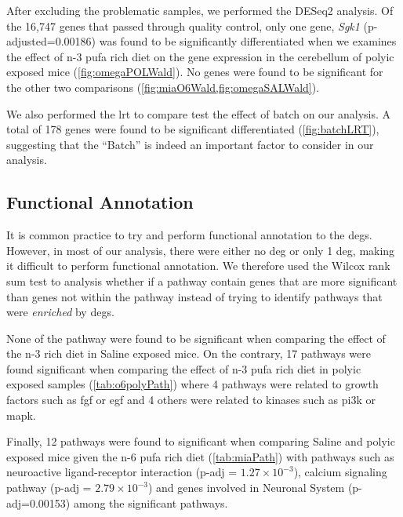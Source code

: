 \documentclass[12pt]{scrbook}
\begin{document}
After excluding the problematic samples, we performed the DESeq2 analysis.
Of the 16,747 genes that passed through quality control, only one gene, \textit{Sgk1} (p-adjusted=0.00186) was found to be significantly differentiated when we examines the effect of n-3 \gls{pufa} rich diet on the gene expression in the cerebellum of \gls{polyic} exposed mice (\cref{fig:omegaPOLWald}).
No genes were found to be significant for the other two comparisons (\cref{fig:miaO6Wald,fig:omegaSALWald}).

We also performed the \gls{lrt} to compare test the effect of batch on our analysis. 
A total of 178 genes were found to be significant differentiated (\cref{fig:batchLRT}), suggesting that the ``Batch'' is indeed an important factor to consider in our analysis.

\subsection{Functional Annotation}
It is common practice to try and perform functional annotation to the \glspl{deg}. 
However, in most of our analysis, there were either no \gls{deg} or only 1 \gls{deg}, making it difficult to perform functional annotation.
We therefore used the Wilcox rank sum test to analysis whether if a pathway contain genes that are more significant than genes not within the pathway instead of trying to identify pathways that were \emph{enriched} by \glspl{deg}.

None of the pathway were found to be significant when comparing the effect of the n-3 rich diet in Saline exposed mice. 
On the contrary, 17 pathways were found significant when comparing the effect of n-3 \gls{pufa} rich diet in \gls{polyic} exposed samples (\cref{tab:o6polyPath}) where 4 pathways were related to growth factors such as \gls{fgf} or \gls{egf} and 4 others were related to kinases such as \gls{pi3k} or \gls{mapk}.

Finally, 12 pathways were found to significant when comparing Saline and \gls{polyic} exposed mice given the n-6 \gls{pufa} rich diet (\cref{tab:miaPath}) with pathways such as neuroactive ligand-receptor interaction (p-adj = $1.27\times10^{-3}$), calcium signaling pathway (p-adj = $2.79\times10^{-3}$) and genes involved in Neuronal System (p-adj=0.00153) among the significant pathways.
\end{document}
